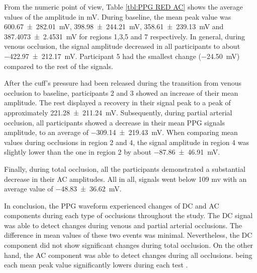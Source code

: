 From the numeric point of view, Table \ref{tbl:PPG RED AC} shows the average values of the amplitude in mV. During baseline, the mean peak value was \SI{600.67(28201)}{\milli\volt}, \SI{398.98(24421)}{\milli\volt}, \SI{358.61(23913)}{\milli\volt} and \SI{387.4073(24531)}{\milli\volt} for regions 1,3,5 and 7 respectively. In general, during venous occlusion, the signal amplitude decreased in all participants to about \SI{-422.97(21217)}{\milli\volt}. Participant 5 had the smallest change (\SI{-24.50}{\milli\volt}) compared to the rest of the signals. 

After the cuff's pressure had been released during the transition from venous occlusion to baseline, participants 2 and 3 showed an increase of their mean amplitude. The rest displayed a recovery in their signal peak to a peak of approximately \SI{221.28(21124)}{\milli\volt}. Subsequently, during partial arterial occlusion, all participants showed a decrease in their mean PPG signals amplitude, to an average of \SI{-309.14(21943)}{\milli\volt}. When comparing mean values during occlusions in region 2 and 4, the signal amplitude in region 4 was slightly lower than the one in region 2 by about \SI{-87.86(4691)}{\milli\volt}. 

Finally, during total occlusion, all the participants demonstrated a substantial decrease in their AC amplitudes. All in all, signals went below 109 mv with an average value of \SI{-48.83(3662)}{\milli\volt}.

In conclusion, the PPG waveform experienced changes of DC and AC components during each type of occlusions throughout the study. The DC signal was able to detect changes during venous and partial arterial occlusions. The difference in mean values of these two events was minimal. Nevertheless, the DC component did not show significant changes during total occlusion.  On the other hand, the AC component was able to detect changes during all occlusions. being each mean peak value significantly lowers during each test . 



